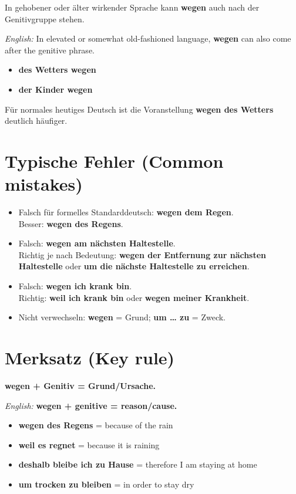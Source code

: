 \documentclass[a4paper]{article}
\begin{document}
   In gehobener oder älter wirkender Sprache kann \textbf{wegen} auch nach der Genitivgruppe stehen.

   \textit{English:} In elevated or somewhat old-fashioned language, \textbf{wegen} can also come after the genitive phrase.

   \begin{itemize}
      \item \textbf{des Wetters wegen}
      \item \textbf{der Kinder wegen}
   \end{itemize}

   Für normales heutiges Deutsch ist die Voranstellung \textbf{wegen des Wetters} deutlich häufiger.

   \section{Typische Fehler \textnormal{(Common mistakes)}}

   \begin{itemize}
      \item Falsch für formelles Standarddeutsch: \textbf{wegen dem Regen}.\\
      Besser: \textbf{wegen des Regens}.
      \item Falsch: \textbf{wegen am nächsten Haltestelle}.\\
      Richtig je nach Bedeutung: \textbf{wegen der Entfernung zur nächsten Haltestelle} oder \textbf{um die nächste Haltestelle zu erreichen}.
      \item Falsch: \textbf{wegen ich krank bin}.\\
      Richtig: \textbf{weil ich krank bin} oder \textbf{wegen meiner Krankheit}.
      \item Nicht verwechseln: \textbf{wegen} = Grund; \textbf{um \ldots{} zu} = Zweck.
   \end{itemize}

   \section{Merksatz \textnormal{(Key rule)}}

   \textbf{wegen + Genitiv = Grund/Ursache.}

   \textit{English:} \textbf{wegen + genitive = reason/cause.}

   \begin{itemize}
      \item \textbf{wegen des Regens} = because of the rain
      \item \textbf{weil es regnet} = because it is raining
      \item \textbf{deshalb bleibe ich zu Hause} = therefore I am staying at home
      \item \textbf{um trocken zu bleiben} = in order to stay dry
   \end{itemize}


   
   
\end{document}
